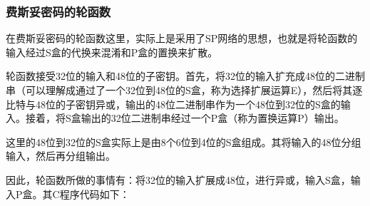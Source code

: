 \subsubsection{费斯妥密码的轮函数}
在费斯妥密码的轮函数这里，实际上是采用了SP网络的思想，也就是将轮函数的输入经过S盒的代换来混淆和P盒的置换来扩散。\par
轮函数接受32位的输入和48位的子密钥。首先，将32位的输入扩充成48位的二进制串（可以理解成通过了一个32位到48位的S盒，称为选择扩展运算E），然后将其逐比特与48位的子密钥异或，输出的48位二进制串作为一个48位到32位的S盒的输入。接着，将S盒输出的32位二进制串经过一个P盒（称为置换运算P）输出。\par
这里的48位到32位的S盒实际上是由8个6位到4位的S盒组成。其将输入的48位分组输入，然后再分组输出。\par
因此，轮函数所做的事情有：将32位的输入扩展成48位，进行异或，输入S盒，输入P盒。其C程序代码如下：
